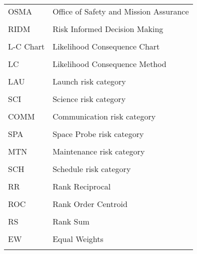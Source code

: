 \clearpage

\begin{table}[h]
    \begin{center}
        \begin{tabular}{ L{4cm} L{10cm}}
            
            OSMA & Office of Safety and Mission Assurance \\ \\
            
            RIDM & Risk Informed Decision Making \\ \\
            
            L-C Chart & Likelihood Consequence Chart \\ \\
            
            LC & Likelihood Consequence Method \\ \\
            
            LAU & Launch risk category \\ \\
            
            SCI & Science risk category  \\ \\
            
            COMM & Communication risk category  \\ \\
            
            SPA & Space Probe risk category \\ \\
            
            MTN & Maintenance risk category \\ \\
            
            SCH & Schedule risk category \\ \\
            
            RR & Rank Reciprocal \\ \\
            
            ROC & Rank Order Centroid \\ \\
            
            RS & Rank Sum \\ \\
            
            EW & Equal Weights \\ \\
            
        \end{tabular}
            \label{table:30}
    \end{center}
\end{table}


\clearpage